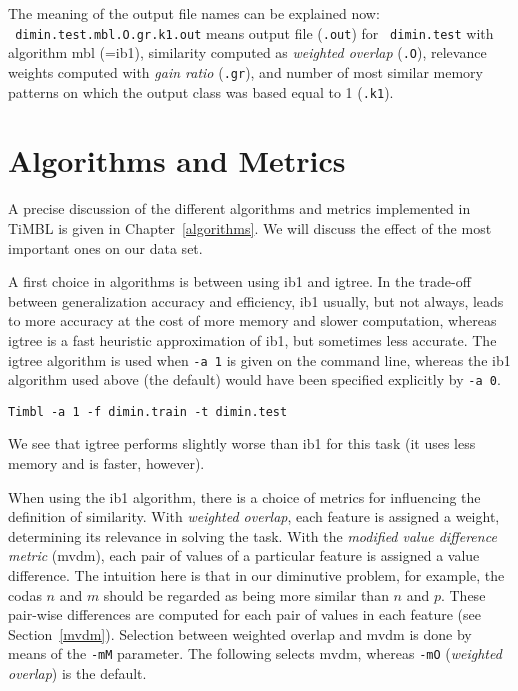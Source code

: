 \documentclass{report}
\begin{document}
The meaning of the output file names can be explained now:\\ {\tt
dimin.test.mbl.O.gr.k1.out} means output file ({\tt .out}) for {\tt
dimin.test} with algorithm {\sc mbl} (={\sc ib1}), similarity computed
as {\em weighted overlap} ({\tt .O}), relevance weights computed with
{\em gain ratio} ({\tt .gr}), and number of most similar memory
patterns on which the output class was based equal to 1 ({\tt .k1}).

\section{Algorithms and Metrics}

A precise discussion of the different algorithms and metrics
implemented in TiMBL is given in Chapter~\ref{algorithms}. We will
discuss the effect of the most important ones on our data set.

A first choice in algorithms is between using {\sc ib1} and {\sc
igtree}. In the trade-off between generalization accuracy and
efficiency, {\sc ib1} usually, but not always, leads to more accuracy
at the cost of more memory and slower computation, whereas {\sc
igtree} is a fast heuristic approximation of {\sc ib1}, but sometimes
less accurate. The {\sc igtree} algorithm is used when {\tt -a 1} is
given on the command line, whereas the {\sc ib1} algorithm used above
(the default) would have been specified explicitly by {\tt -a 0}. 

{\small
\begin{verbatim}
Timbl -a 1 -f dimin.train -t dimin.test
\end{verbatim}
} We see that {\sc igtree} performs slightly worse than {\sc ib1} for
this task (it uses less memory and is faster, however).

When using the {\sc ib1} algorithm, there is a choice of metrics for
influencing the definition of similarity. With {\em weighted overlap},
each feature is assigned a weight, determining its relevance in
solving the task. With the {\em modified value difference metric}
({\sc mvdm}), each pair of values of a particular feature is assigned
a value difference. The intuition here is that in our diminutive
problem, for example, the codas $n$ and $m$ should be regarded as
being more similar than $n$ and $p$. These pair-wise differences are
computed for each pair of values in each feature (see
Section~\ref{mvdm}). Selection between weighted overlap and {\sc mvdm}
is done by means of the {\tt -mM} parameter. The following selects {\sc
mvdm}, whereas {\tt -mO} ({\em weighted overlap}) is the default.
\end{document}
